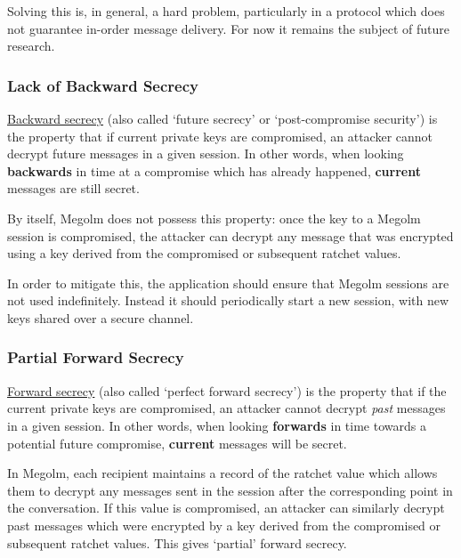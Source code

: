 \documentclass[10pt]{article}
\begin{document}
Solving this is, in general, a hard problem, particularly in a protocol
which does not guarantee in-order message delivery. For now it remains
the subject of future research.

\subsubsection{Lack of Backward
Secrecy}\label{lack-of-backward-secrecy}

\href{https://intensecrypto.org/public/lec_08_hash_functions_part2.html\#sec-forward-and-backward-secrecy}{Backward
secrecy} (also called `future secrecy' or `post-compromise security') is
the property that if current private keys are compromised, an attacker
cannot decrypt future messages in a given session. In other words, when
looking \textbf{backwards} in time at a compromise which has already
happened, \textbf{current} messages are still secret.

By itself, Megolm does not possess this property: once the key to a
Megolm session is compromised, the attacker can decrypt any message that
was encrypted using a key derived from the compromised or subsequent
ratchet values.

In order to mitigate this, the application should ensure that Megolm
sessions are not used indefinitely. Instead it should periodically start
a new session, with new keys shared over a secure channel.

\subsubsection{Partial Forward Secrecy}\label{partial-forward-secrecy}

\href{https://intensecrypto.org/public/lec_08_hash_functions_part2.html\#sec-forward-and-backward-secrecy}{Forward
secrecy} (also called `perfect forward secrecy') is the property that if
the current private keys are compromised, an attacker cannot decrypt
\emph{past} messages in a given session. In other words, when looking
\textbf{forwards} in time towards a potential future compromise,
\textbf{current} messages will be secret.

In Megolm, each recipient maintains a record of the ratchet value which
allows them to decrypt any messages sent in the session after the
corresponding point in the conversation. If this value is compromised,
an attacker can similarly decrypt past messages which were encrypted by
a key derived from the compromised or subsequent ratchet values. This
gives `partial' forward secrecy.
\end{document}
